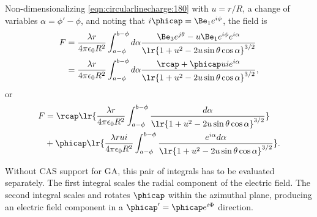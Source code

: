 Non-dimensionalizing \cref{eqn:circularlinecharge:180} with \( u = r/R \), a change of variables \( \alpha = \phi' - \phi \), and noting that \( i \phicap = \Be_1 e^{i \phi} \), the field is
\begin{equation}\label{eqn:circularlinecharge:200}
\begin{aligned}
F
&= \frac{\lambda r}{4 \pi \epsilon_0 R^2} \int_{a-\phi}^{b-\phi} d\alpha \frac{ \Be_3 e^{j \theta } - u \Be_1 e^{i\phi} e^{i \alpha} }{\lr{ 1 + u^2 - 2 u \sin\theta \cos \alpha }^{3/2} } \\
&= \frac{\lambda r}{4 \pi \epsilon_0 R^2} \int_{a-\phi}^{b-\phi} d\alpha \frac{ \rcap + \phicap u i e^{i \alpha } }{\lr{ 1 + u^2 - 2 u \sin\theta \cos \alpha }^{3/2} },
\end{aligned}
\end{equation}
or
\begin{equation}\label{eqn:circularlinecharge:220}
\begin{aligned}
F
&= \rcap \lr{ \frac{\lambda r}{4 \pi \epsilon_0 R^2} \int_{a-\phi}^{b-\phi} \frac{ d\alpha }{\lr{ 1 + u^2 - 2 u \sin\theta \cos \alpha }^{3/2} } } \\
&+ \phicap \lr{
\frac{\lambda r u i}{4 \pi \epsilon_0 R^2} \int_{a-\phi}^{b-\phi} \frac{ e^{i \alpha } d\alpha }{\lr{ 1 + u^2 - 2 u \sin\theta \cos \alpha }^{3/2} }
}.
\end{aligned}
\end{equation}

Without CAS support for GA, this pair of integrals has to be evaluated separately.
The first integral
scales the radial component of the electric field.
The second integral scales and rotates \( \phicap \) within the azimuthal plane, producing an electric field component in a \( \phicap' = \phicap e^{i \Phi} \) direction.

